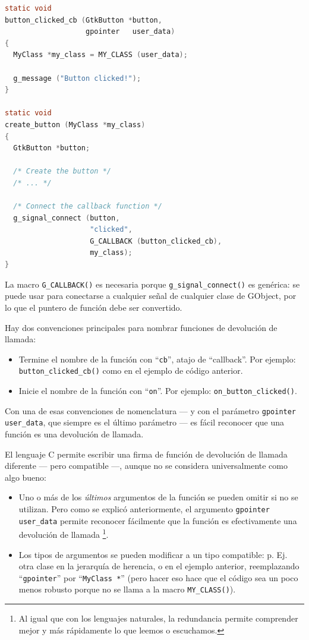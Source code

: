 \begin{lstlisting}[language=C, caption={Cómo conectarse a una señal}, label=oop-gobject-connect-to-signal]
static void
button_clicked_cb (GtkButton *button,
                   gpointer   user_data)
{
  MyClass *my_class = MY_CLASS (user_data);

  g_message ("Button clicked!");
}

static void
create_button (MyClass *my_class)
{
  GtkButton *button;

  /* Create the button */
  /* ... */

  /* Connect the callback function */
  g_signal_connect (button,
                    "clicked",
                    G_CALLBACK (button_clicked_cb),
                    my_class);
}
\end{lstlisting}

La macro \lstinline{G_CALLBACK()} es necesaria porque \lstinline{g_signal_connect()} es genérica: se puede usar para conectarse a cualquier señal de cualquier clase de GObject, por lo que el puntero de función debe ser convertido.

Hay dos convenciones principales para nombrar funciones de devolución de llamada:
\begin{itemize}
  \item Termine el nombre de la función con ``\lstinline{cb}'', atajo de ``callback''. Por ejemplo: \lstinline{button_clicked_cb()} como en el ejemplo de código anterior.
  \item Inicie el nombre de la función con ``\lstinline{on}''. Por ejemplo: \lstinline{on_button_clicked()}.
\end{itemize}

Con una de esas convenciones de nomenclatura --- y con el parámetro \lstinline{gpointer user_data}, que siempre es el último parámetro --- es fácil reconocer que una función es una devolución de llamada.

El lenguaje C permite escribir una firma de función de devolución de llamada diferente --- pero compatible ---, aunque no se considera universalmente como algo bueno:
\begin{itemize}
  \item Uno o más de los \emph{últimos} argumentos de la función se pueden omitir si no se utilizan. Pero como se explicó anteriormente, el argumento \lstinline{gpointer user_data} permite reconocer fácilmente que la función es efectivamente una devolución de llamada \footnote{Al igual que con los lenguajes naturales, la redundancia permite comprender mejor y más rápidamente lo que leemos o escuchamos.}.
  \item Los tipos de argumentos se pueden modificar a un tipo compatible: p. Ej. otra clase en la jerarquía de herencia, o en el ejemplo anterior, reemplazando ``\lstinline{gpointer}'' por ``\lstinline{MyClass *}'' (pero hacer eso hace que el código sea un poco menos robusto porque no se llama a la macro \lstinline{MY_CLASS()}).
\end{itemize}

